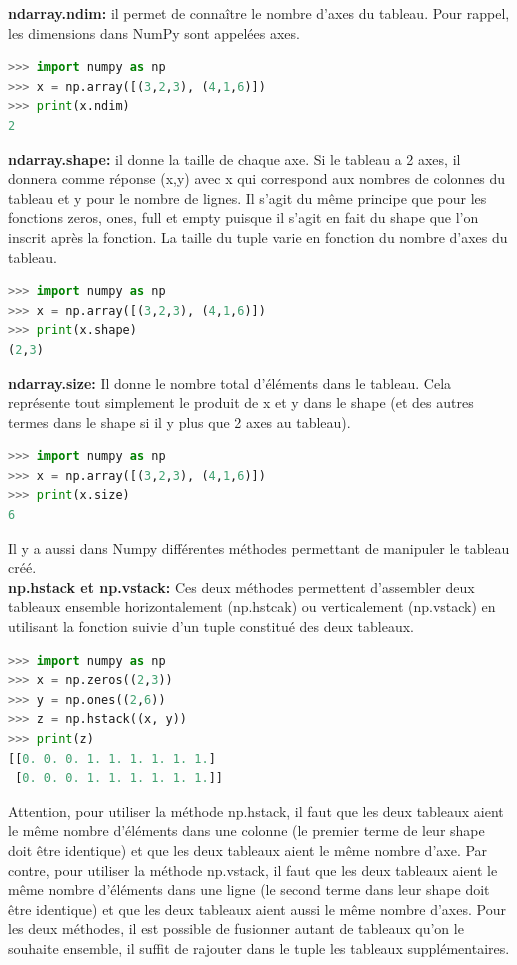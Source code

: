 \documentclass[a4paper, 12pt]{article}
\numberwithin{equation}{subsection}
\begin{document}
\textbf{ndarray.ndim:} il permet de connaître le nombre d’axes du tableau. Pour rappel, les dimensions dans NumPy sont appelées axes.
\begin{lstlisting}[language=Python]
>>> import numpy as np
>>> x = np.array([(3,2,3), (4,1,6)])
>>> print(x.ndim)
2
\end{lstlisting}
\textbf{ndarray.shape:} il donne la taille de chaque axe. Si le tableau a 2 axes, il donnera comme réponse (x,y) avec x qui correspond aux nombres de colonnes du tableau et y pour le nombre de lignes. Il s’agit du même principe que pour les fonctions zeros, ones, full et empty puisque il s’agit en fait du shape que l’on inscrit après la fonction. La taille du tuple varie en fonction du nombre d’axes du tableau.
\begin{lstlisting}[language=Python]
>>> import numpy as np
>>> x = np.array([(3,2,3), (4,1,6)])
>>> print(x.shape)
(2,3)
\end{lstlisting}
\textbf{ndarray.size:} Il donne le nombre total d’éléments dans le tableau. Cela représente tout simplement le produit de x et y dans le shape (et des autres termes dans le shape si il y plus que 2 axes au tableau).
\begin{lstlisting}[language=Python]
>>> import numpy as np
>>> x = np.array([(3,2,3), (4,1,6)])
>>> print(x.size)
6
\end{lstlisting}
Il y a aussi dans Numpy différentes méthodes permettant de manipuler le tableau créé.\\

\textbf{np.hstack et np.vstack:} Ces deux méthodes permettent d’assembler deux tableaux ensemble horizontalement (np.hstcak) ou verticalement (np.vstack) en utilisant la fonction suivie d’un tuple constitué des deux tableaux.
\begin{lstlisting}[language=Python]
>>> import numpy as np
>>> x = np.zeros((2,3))
>>> y = np.ones((2,6))
>>> z = np.hstack((x, y))
>>> print(z)
[[0. 0. 0. 1. 1. 1. 1. 1. 1.]
 [0. 0. 0. 1. 1. 1. 1. 1. 1.]]
\end{lstlisting}
Attention, pour utiliser la méthode np.hstack, il faut que les deux tableaux aient le même nombre d’éléments dans une colonne (le premier terme de leur shape doit être identique) et que les deux tableaux aient le même nombre d’axe. Par contre, pour utiliser la méthode np.vstack, il faut que les deux tableaux aient le même nombre d’éléments dans une ligne (le second terme dans leur shape doit être identique) et que les deux tableaux aient aussi le même nombre d’axes. Pour les deux méthodes, il est possible de fusionner autant de tableaux qu’on le souhaite ensemble, il suffit de rajouter dans le tuple les tableaux supplémentaires.\\
\end{document}
